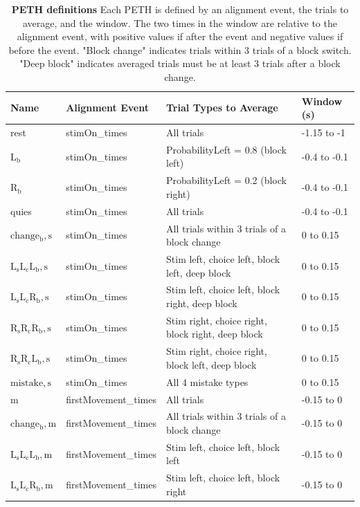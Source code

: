 \documentclass[10pt,lineno]{elife}
\begin{document}
\FloatBarrier
\begin{table}[h!]
\centering
\caption{\textbf{PETH definitions} Each PETH is defined by an alignment event, the trials to average, and the window. The two times in the window are relative to the alignment event, with positive values if after the event and negative values if before the event. "Block change" indicates trials within 3 trials of a block switch. "Deep block" indicates averaged trials must be at least 3 trials after a block change.}
\label{tab1}
\begin{tabular}{|l|l|l|l|}
\hline
\textbf{Name} & \textbf{Alignment Event} & \textbf{Trial Types to Average} & \textbf{Window (s)} \\ \hline
\textup{rest} & stimOn\_times & All trials & -1.15 to -1 \\ \hline
$\mathrm{L_b}$ & stimOn\_times & ProbabilityLeft = 0.8 (block left) & -0.4 to -0.1 \\ \hline
$\mathrm{R_b}$ & stimOn\_times & ProbabilityLeft = 0.2 (block right) & -0.4 to -0.1 \\ \hline
\textup{quies} & stimOn\_times & All trials & -0.4 to -0.1 \\ \hline
$\mathrm{change_b,s}$ & stimOn\_times & All trials within 3 trials of a block change & 0 to 0.15 \\ \hline
$\mathrm{L_{s}L_{c}L_{b},s}$ & stimOn\_times & Stim left, choice left, block left, deep block & 0 to 0.15 \\ \hline
$\mathrm{L_{s}L_{c}R_{b},s}$ & stimOn\_times & Stim left, choice left, block right, deep block & 0 to 0.15 \\ \hline
$\mathrm{R_{s}R_{c}R_{b},s}$ & stimOn\_times & Stim right, choice right, block right, deep block & 0 to 0.15 \\ \hline
$\mathrm{R_{s}R_{c}L_{b},s}$ & stimOn\_times & Stim right, choice right, block left, deep block & 0 to 0.15 \\ \hline
$\mathrm{mistake,s}$ & stimOn\_times & All 4 mistake types & 0 to 0.15 \\ \hline
\textup{m} & firstMovement\_times & All trials & -0.15 to 0 \\ \hline
$\mathrm{change_b,m}$ & firstMovement\_times & All trials within 3 trials of a block change & -0.15 to 0 \\ \hline
$\mathrm{L_{s}L_{c}L_{b},m}$ & firstMovement\_times & Stim left, choice left, block left & -0.15 to 0 \\ \hline
$\mathrm{L_{s}L_{c}R_{b},m}$ & firstMovement\_times & Stim left, choice left, block right & -0.15 to 0 \\ \hline

\end{tabular}
\end{table}
\end{document}
